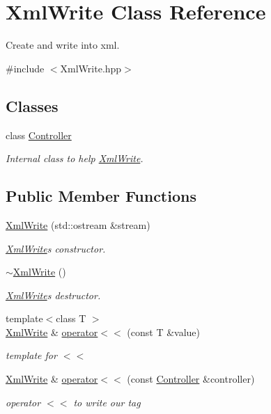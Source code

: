 \hypertarget{class_xml_write}{}\section{Xml\+Write Class Reference}
\label{class_xml_write}


Create and write into xml.  




{\ttfamily \#include $<$Xml\+Write.\+hpp$>$}

\subsection*{Classes}
\begin{DoxyCompactItemize}
\item 
class \hyperlink{class_xml_write_1_1_controller}{Controller}
\begin{DoxyCompactList}\small\item\em Internal class to help \hyperlink{class_xml_write}{Xml\+Write}. \end{DoxyCompactList}\end{DoxyCompactItemize}
\subsection*{Public Member Functions}
\begin{DoxyCompactItemize}
\item 
\hyperlink{class_xml_write_af52da20afc341ca69b7904c77696b012}{Xml\+Write} (std\+::ostream \&stream)
\begin{DoxyCompactList}\small\item\em \hyperlink{class_xml_write}{Xml\+Write}\textquotesingle{}s constructor. \end{DoxyCompactList}\item 
\hyperlink{class_xml_write_a5f8a23c115f58b38ae0192e5ac2627d5}{$\sim$\+Xml\+Write} ()
\begin{DoxyCompactList}\small\item\em \hyperlink{class_xml_write}{Xml\+Write}\textquotesingle{}s destructor. \end{DoxyCompactList}\item 
{\footnotesize template$<$class T $>$ }\\\hyperlink{class_xml_write}{Xml\+Write} \& \hyperlink{class_xml_write_a6154b8d035db4a591132ed26acb4d68a}{operator$<$$<$} (const T \&value)
\begin{DoxyCompactList}\small\item\em template for $<$$<$ \end{DoxyCompactList}\item 
\hyperlink{class_xml_write}{Xml\+Write} \& \hyperlink{class_xml_write_a6aec927dec4b9512329a2b8e11888f19}{operator$<$$<$} (const \hyperlink{class_xml_write_1_1_controller}{Controller} \&controller)
\begin{DoxyCompactList}\small\item\em operator $<$$<$ to write our tag \end{DoxyCompactList}\end{DoxyCompactItemize}
